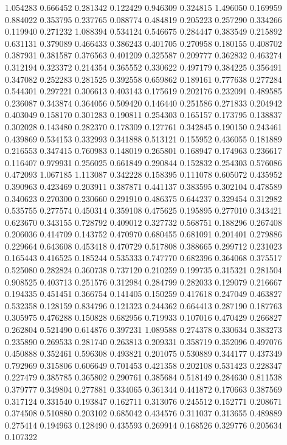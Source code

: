 1.054283
0.666452
0.281342
0.122429
0.946309
0.324815
1.496050
0.169959
0.884022
0.353795
0.237765
0.088774
0.484819
0.205223
0.257290
0.334266
0.119940
0.271232
1.088394
0.534124
0.546675
0.284447
0.383549
0.215892
0.631131
0.379089
0.466433
0.386243
0.401705
0.270958
0.180155
0.408702
0.387931
0.381587
0.376563
0.401209
0.325587
0.209777
0.362832
0.463274
0.312194
0.323372
0.214354
0.365552
0.330622
0.497179
0.384225
0.356491
0.347082
0.252283
0.281525
0.392558
0.659862
0.189161
0.777638
0.277284
0.544301
0.297221
0.306613
0.403143
0.175619
0.202176
0.232091
0.489585
0.236087
0.343874
0.364056
0.509420
0.146440
0.251586
0.271833
0.204942
0.403049
0.158170
0.301283
0.190811
0.254303
0.165157
0.173795
0.138837
0.302028
0.143480
0.282370
0.178309
0.127761
0.342845
0.190150
0.243461
0.439869
0.534153
0.332993
0.341888
0.513121
0.155952
0.436055
0.181889
0.216553
0.347415
0.760983
0.148019
0.265801
0.168947
0.174963
0.236617
0.116407
0.979931
0.256025
0.661849
0.290844
0.152832
0.254303
0.576086
0.472093
1.067185
1.113087
0.342228
0.158395
0.111078
0.605072
0.435952
0.390963
0.423469
0.203911
0.387871
0.441137
0.383595
0.302104
0.478589
0.340623
0.270300
0.230660
0.291910
0.486375
0.644237
0.329454
0.312982
0.535755
0.277574
0.450314
0.359108
0.475625
0.195895
0.277010
0.343421
0.623670
0.343155
0.728792
0.409012
0.327732
0.568751
0.188296
0.267408
0.206036
0.414709
0.143752
0.470970
0.680455
0.681091
0.201401
0.279886
0.229664
0.643608
0.453418
0.470729
0.517808
0.388665
0.299712
0.231023
0.165443
0.416525
0.185244
0.535333
0.747770
0.682396
0.364068
0.375517
0.525080
0.282824
0.360738
0.737120
0.210259
0.199735
0.315321
0.281504
0.908525
0.403713
0.251576
0.312984
0.284799
0.282033
0.129079
0.216667
0.194335
0.451451
0.366754
0.141405
0.150259
0.417618
0.247049
0.463827
0.532358
0.128159
0.834796
0.121323
0.244362
0.664413
0.287190
0.187763
0.305975
0.476288
0.150828
0.682956
0.719933
0.107016
0.470429
0.266827
0.262804
0.521490
0.614876
0.397231
1.089588
0.274378
0.330634
0.383273
0.235890
0.269533
0.281740
0.263813
0.209331
0.358719
0.352096
0.497076
0.450888
0.352461
0.596308
0.493821
0.201075
0.530889
0.344177
0.437349
0.792969
0.315806
0.606649
0.701453
0.421358
0.202108
0.531423
0.228347
0.227479
0.385785
0.365802
0.290761
0.385684
0.518149
0.284630
0.811538
0.379777
0.349804
0.277881
0.334065
0.361344
0.441872
0.170663
0.387569
0.317124
0.331540
0.193847
0.162711
0.313076
0.245512
0.152771
0.208671
0.374508
0.510880
0.203102
0.685042
0.434576
0.311037
0.313655
0.489889
0.275414
0.194963
0.128490
0.435593
0.269914
0.168526
0.329776
0.205634
0.107322
